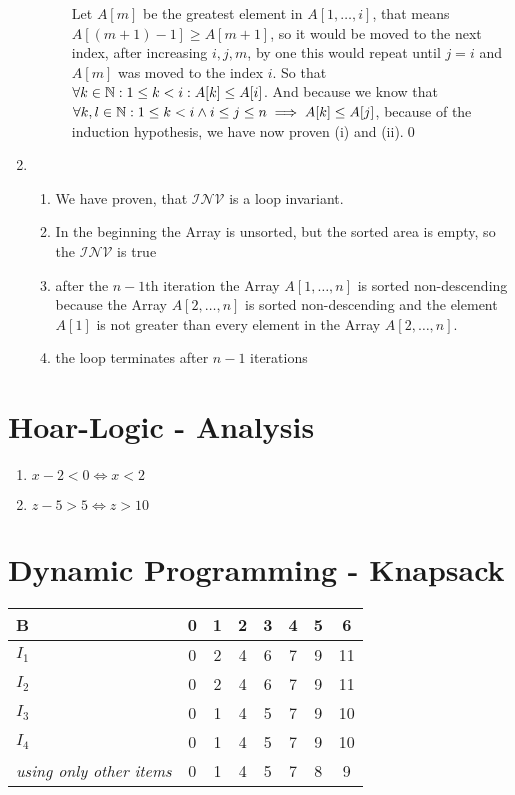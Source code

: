 \documentclass[sectionformat = exercise]{gadsescript}
\begin{document}
\begin{enumerate}[label=\alph*)]
\begin{description}
				Let $ A[m] $ be the greatest element in $ A[1, \dotsc, i] $, that means $ A[(m+1)-1] \geq A[m + 1] $, so it would be moved to the next index, after increasing $ i, j, m $, by one this would repeat until $ j=i $ and $ A[m] $ was moved to the index $ i $.
				So that $ \forall k \in \mathbb{N} : 1 \leq k < i : A[k] \leq A[i] $.
				And because we know that $ \forall k,l \in \mathbb{N} : 1 \leq k < i \wedge i \leq  j \leq n \implies A[k] \leq A[j] $, because of the induction hypothesis, we have now proven (i) and (ii).\qed
		\end{description}
	\item \begin{enumerate}[label=(\roman*)]
		\item We have proven, that $ \mathcal{INV}  $ is a loop invariant.
		\item In the beginning the Array is unsorted, but the sorted area is empty, so the $ \mathcal{INV} $ is true
		\item after the $ n-1 $th iteration the Array $ A[1, \dotsc, n] $ is sorted non-descending because the Array $ A[2, \dotsc, n] $ is sorted non-descending and the element $ A[1] $ is not greater than every element in the Array $ A[2, \dotsc, n] $.
		\item the loop terminates after $ n-1 $ iterations
	\end{enumerate}
\end{enumerate}
	
\section{Hoar-Logic - Analysis}
\begin{enumerate}[label=\alph*)]
	\item $ x - 2 < 0 \iff x < 2 $ 
	\item $ z - 5 > 5 \iff z > 10 $
\end{enumerate}

\section{Dynamic Programming - Knapsack}
\begin{tabular}{|l|c|c|c|c|c|c|c|}
	\hline
	B 	& 0 & 1 & 2 & 3 & 4 & 5 & 6 \\\hline
	\hline
	$ I_1 $ & 0 & 2 & 4 & 6 & 7 & 9 & 11 \\\hline
	$ I_2 $ & 0 & 2 & 4 & 6 & 7 & 9 & 11 \\\hline
	$ I_3 $ & 0 & 1 & 4 & 5 & 7 & 9 & 10 \\\hline
	$ I_4 $ & 0 & 1 & 4 & 5 & 7 & 9 & 10 \\\hline
	\textit{using only other items}
		& 0 & 1 & 4 & 5 & 7 & 8 & 9 \\\hline

	
\end{tabular}
\end{document}
